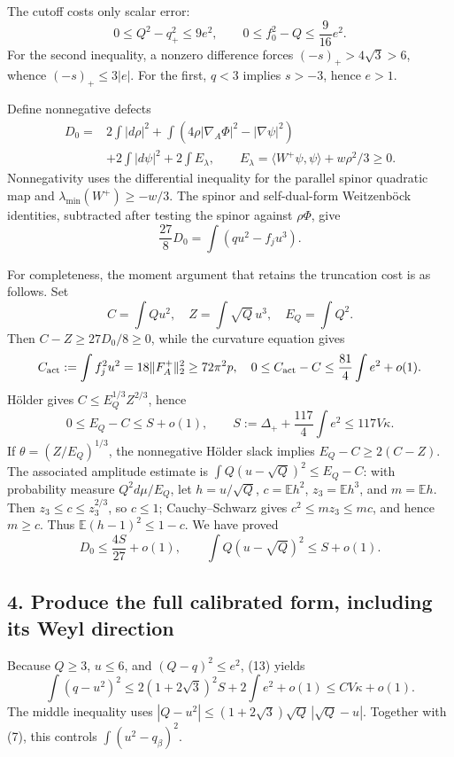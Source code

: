 \documentclass[
  10pt,
]{article}
\begin{document}
The cutoff costs only scalar error: \[
0\le Q^2-q_+^2\le9e^2,\qquad
0\le f_0^2-Q\le\frac9{16}e^2.
\tag{10}
\] For the second inequality, a nonzero difference forces
\((-s)_+>4\sqrt3>6\), whence \((-s)_+\le3|e|\). For the first, \(q<3\)
implies \(s>-3\), hence \(e>1\).

Define nonnegative defects \[
\begin{aligned}
D_0={}&2\int|d\rho|^2
+\int(4\rho|\nabla_A\Phi|^2-|\nabla\psi|^2)\\
&+2\int|d\psi|^2+2\int E_\lambda,\qquad
E_\lambda=\langle W^+\psi,\psi\rangle+w\rho^2/3\ge0.
\end{aligned}
\tag{11}
\] Nonnegativity uses the differential inequality for the parallel
spinor quadratic map and \(\lambda_{\min}(W^+)\ge-w/3\). The spinor and
self-dual-form Weitzenböck identities, subtracted after testing the
spinor against \(\rho\Phi\), give \[
\frac{27}{8}D_0=\int(qu^2-f_j u^3).
\tag{12}
\]

For completeness, the moment argument that retains the truncation cost
is as follows. Set \[
C=\int Qu^2,\quad Z=\int\sqrt Q\,u^3,\quad E_Q=\int Q^2.
\] Then \(C-Z\ge27D_0/8\ge0\), while the curvature equation gives \[
C_{\rm act}:=\int f_j^2u^2=18\|F_A^+\|_2^2\ge72\pi^2p,
\quad 0\le C_{\rm act}-C\le\frac{81}{4}\int e^2+o(1).
\] Hölder gives \(C\le E_Q^{1/3}Z^{2/3}\), hence \[
0\le E_Q-C\le S+o(1),\qquad
S:=\Delta_++\frac{117}{4}\int e^2\le117V\kappa.
\] If \(\theta=(Z/E_Q)^{1/3}\), the nonnegative Hölder slack implies
\(E_Q-C\ge2(C-Z)\). The associated amplitude estimate is
\(\int Q(u-\sqrt Q)^2\le E_Q-C\): with probability measure
\(Q^2d\mu/E_Q\), let \(h=u/\sqrt Q\), \(c=\mathbb E h^2\),
\(z_3=\mathbb E h^3\), and \(m=\mathbb E h\). Then
\(z_3\le c\le z_3^{2/3}\), so \(c\le1\); Cauchy--Schwarz gives
\(c^2\le m z_3\le mc\), and hence \(m\ge c\). Thus
\(\mathbb E(h-1)^2\le1-c\). We have proved \[
D_0\le\frac{4S}{27}+o(1),\qquad
\int Q(u-\sqrt Q)^2\le S+o(1).
\tag{13}
\]

\hypertarget{produce-the-full-calibrated-form-including-its-weyl-direction}{%
\subsection{4. Produce the full calibrated form, including its Weyl
direction}\label{produce-the-full-calibrated-form-including-its-weyl-direction}}

Because \(Q\ge3\), \(u\le6\), and \((Q-q)^2\le e^2\), (13) yields \[
\int(q-u^2)^2
\le2(1+2\sqrt3)^2S+2\int e^2+o(1)
\le C V\kappa+o(1).
\tag{14}
\] The middle inequality uses
\(|Q-u^2|\le(1+2\sqrt3)\sqrt Q\,|\sqrt Q-u|\). Together with (7), this
controls \(\int(u^2-q_\beta)^2\).
\end{document}
